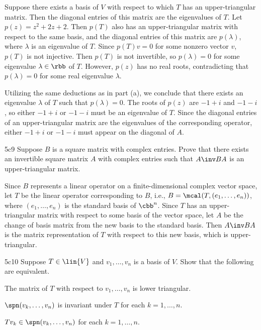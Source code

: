 \begin{solenum}
    \item Suppose there exists a basis of $V$ with respect to which $T$ has an upper-triangular matrix.
    Then the diagonal entries of this matrix are the eigenvalues of $T$.
    Let $p(z) = z^2 + 2z + 2$.
    Then $p(T)$ also has an upper-triangular matrix with respect to the same basis, and the diagonal entries of this matrix are $p(\lambda)$, where $\lambda$ is an eigenvalue of $T$.
    Since $p(T)v = 0$ for some nonzero vector $v$, $p(T)$ is not injective.
    Then $p(T)$ is not invertible, so $p(\lambda) = 0$ for some eigenvalue $\lambda \in \rbb$ of $T$.
    However, $p(z)$ has no real roots, contradicting that $p(\lambda) = 0$ for some real eigenvalue $\lambda$.
    \item Utilizing the same deductions as in part (a), we conclude that there exists an eigenvalue $\lambda$ of $T$ such that $p(\lambda) = 0$.
    The roots of $p(z)$ are $-1 + i$ and $-1 - i$, so either $-1 + i$ or $-1 - i$ must be an eigenvalue of $T$.
    Since the diagonal entries of an upper-triangular matrix are the eigenvalues of the corresponding operator, either $-1 + i$ or $-1 - i$ must appear on the diagonal of $A$.
\end{solenum}

\begin{exercise}{5c9}
    Suppose $B$ is a square matrix with complex entries.
    Prove that there exists an invertible square matrix $A$ with complex entries such that $A\inv BA$ is an upper-triangular matrix.
\end{exercise}

\begin{sol}
    Since $B$ represents a linear operator on a finite-dimensional complex vector space, let $T$ be the linear operator corresponding to $B$, i.e., $B = \mcal(T, (e_1, \ldots, e_n))$, where $(e_1, \ldots, e_n)$ is the standard basis of $\cbb^n$.
    Since $T$ has an upper-triangular matrix with respect to some basis of the vector space, let $A$ be the change of basis matrix from the new basis to the standard basis.
    Then $A\inv BA$ is the matrix representation of $T$ with respect to this new basis, which is upper-triangular.
\end{sol}

\begin{exercise}{5c10}
    Suppose $T \in \lin{V}$ and $v_1, \ldots, v_n$ is a basis of $V$.
    Show that the following are equivalent.
    \begin{subexercises}
        \item The matrix of $T$ with respect to $v_1, \ldots, v_n$ is lower triangular.
        \item $\spn(v_k, \ldots, v_n)$ is invariant under $T$ for each $k = 1, \ldots, n$.
        \item $Tv_k \in \spn(v_k, \ldots, v_n)$ for each $k = 1, \ldots, n$.
    \end{subexercises}
\end{exercise}

